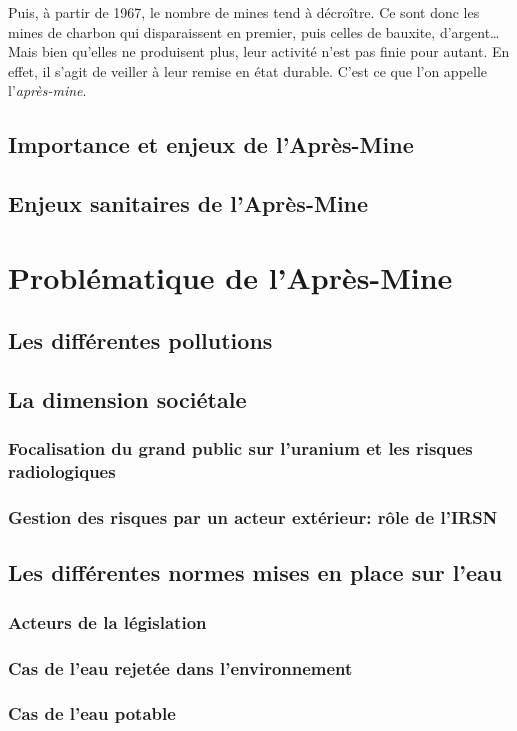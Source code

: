 \documentclass{article}
\begin{document}
Puis, à partir de 1967, le nombre de mines tend à décroître. Ce sont donc les mines de charbon qui disparaissent en premier, puis celles de bauxite, d’argent… Mais bien qu’elles ne produisent plus, leur activité n’est pas finie pour autant. En effet, il s’agit de veiller à leur remise en état durable. C’est ce que l’on appelle l’\emph{après-mine}.

\subsection{Importance et enjeux de l’Après-Mine} 
\subsection{Enjeux sanitaires de l’Après-Mine}

\newpage
\section{Problématique de l’Après-Mine}
\subsection{Les différentes pollutions}
\subsection{La dimension sociétale}
\subsubsection{Focalisation du grand public sur l'uranium et les risques radiologiques}
\subsubsection{Gestion des risques par un acteur extérieur: rôle de l’IRSN}
\subsection{Les différentes normes mises en place sur l’eau}
\subsubsection{Acteurs de la législation} 
\subsubsection{Cas de l’eau rejetée dans l’environnement }
\subsubsection{Cas de l’eau potable} 
\end{document}
